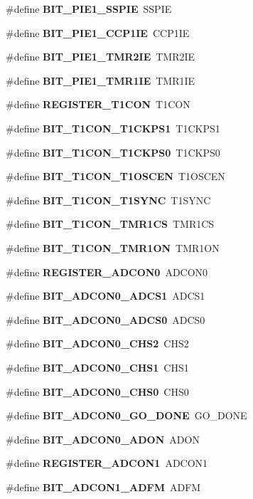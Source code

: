 \begin{DoxyCompactItemize}
\item 
\#define {\bf B\-I\-T\-\_\-\-P\-I\-E1\-\_\-\-S\-S\-P\-I\-E}~S\-S\-P\-I\-E
\item 
\#define {\bf B\-I\-T\-\_\-\-P\-I\-E1\-\_\-\-C\-C\-P1\-I\-E}~C\-C\-P1\-I\-E
\item 
\#define {\bf B\-I\-T\-\_\-\-P\-I\-E1\-\_\-\-T\-M\-R2\-I\-E}~T\-M\-R2\-I\-E
\item 
\#define {\bf B\-I\-T\-\_\-\-P\-I\-E1\-\_\-\-T\-M\-R1\-I\-E}~T\-M\-R1\-I\-E
\item 
\#define {\bf R\-E\-G\-I\-S\-T\-E\-R\-\_\-\-T1\-C\-O\-N}~T1\-C\-O\-N
\item 
\#define {\bf B\-I\-T\-\_\-\-T1\-C\-O\-N\-\_\-\-T1\-C\-K\-P\-S1}~T1\-C\-K\-P\-S1
\item 
\#define {\bf B\-I\-T\-\_\-\-T1\-C\-O\-N\-\_\-\-T1\-C\-K\-P\-S0}~T1\-C\-K\-P\-S0
\item 
\#define {\bf B\-I\-T\-\_\-\-T1\-C\-O\-N\-\_\-\-T1\-O\-S\-C\-E\-N}~T1\-O\-S\-C\-E\-N
\item 
\#define {\bf B\-I\-T\-\_\-\-T1\-C\-O\-N\-\_\-\-T1\-S\-Y\-N\-C}~T1\-S\-Y\-N\-C
\item 
\#define {\bf B\-I\-T\-\_\-\-T1\-C\-O\-N\-\_\-\-T\-M\-R1\-C\-S}~T\-M\-R1\-C\-S
\item 
\#define {\bf B\-I\-T\-\_\-\-T1\-C\-O\-N\-\_\-\-T\-M\-R1\-O\-N}~T\-M\-R1\-O\-N
\item 
\#define {\bf R\-E\-G\-I\-S\-T\-E\-R\-\_\-\-A\-D\-C\-O\-N0}~A\-D\-C\-O\-N0
\item 
\#define {\bf B\-I\-T\-\_\-\-A\-D\-C\-O\-N0\-\_\-\-A\-D\-C\-S1}~A\-D\-C\-S1
\item 
\#define {\bf B\-I\-T\-\_\-\-A\-D\-C\-O\-N0\-\_\-\-A\-D\-C\-S0}~A\-D\-C\-S0
\item 
\#define {\bf B\-I\-T\-\_\-\-A\-D\-C\-O\-N0\-\_\-\-C\-H\-S2}~C\-H\-S2
\item 
\#define {\bf B\-I\-T\-\_\-\-A\-D\-C\-O\-N0\-\_\-\-C\-H\-S1}~C\-H\-S1
\item 
\#define {\bf B\-I\-T\-\_\-\-A\-D\-C\-O\-N0\-\_\-\-C\-H\-S0}~C\-H\-S0
\item 
\#define {\bf B\-I\-T\-\_\-\-A\-D\-C\-O\-N0\-\_\-\-G\-O\-\_\-\-D\-O\-N\-E}~G\-O\-\_\-\-D\-O\-N\-E
\item 
\#define {\bf B\-I\-T\-\_\-\-A\-D\-C\-O\-N0\-\_\-\-A\-D\-O\-N}~A\-D\-O\-N
\item 
\#define {\bf R\-E\-G\-I\-S\-T\-E\-R\-\_\-\-A\-D\-C\-O\-N1}~A\-D\-C\-O\-N1
\item 
\#define {\bf B\-I\-T\-\_\-\-A\-D\-C\-O\-N1\-\_\-\-A\-D\-F\-M}~A\-D\-F\-M

\end{DoxyCompactItemize}
